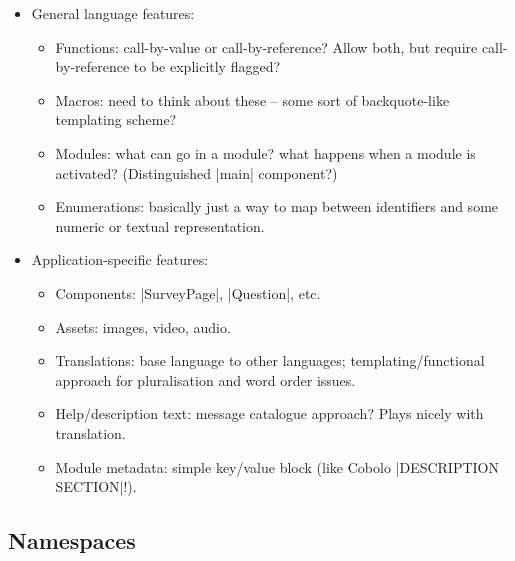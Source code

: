 \documentclass[DIV=calc,paper=a4,fontsize=11pt]{scrartcl}
\begin{document}
\begin{itemize}
  \item{General language features:
    \begin{itemize}
      \item{Functions: call-by-value or call-by-reference?  Allow
        both, but require call-by-reference to be explicitly flagged?}
      \item{Macros: need to think about these -- some sort of
        backquote-like templating scheme?}
      \item{Modules: what can go in a module? what happens when a
        module is activated?  (Distinguished |main| component?)}
      \item{Enumerations: basically just a way to map between
        identifiers and some numeric or textual representation.}
    \end{itemize}}
  \item{Application-specific features:
    \begin{itemize}
      \item{Components: |SurveyPage|, |Question|, etc.}
      \item{Assets: images, video, audio.}
      \item{Translations: base language to other languages;
        templating/functional approach for pluralisation and word
        order issues.}
      \item{Help/description text: message catalogue approach?  Plays
        nicely with translation.}
      \item{Module metadata: simple key/value block (like Cobolo
        |DESCRIPTION SECTION|!).}
    \end{itemize}}
\end{itemize}


\subsection*{Namespaces}
\end{document}
